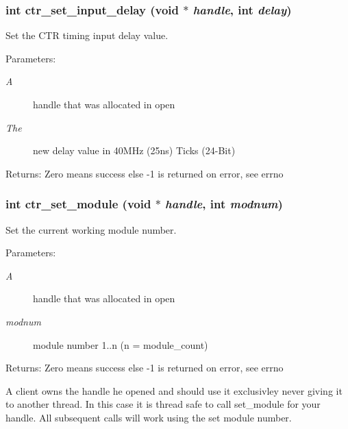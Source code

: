 \subsubsection{\setlength{\rightskip}{0pt plus 5cm}int ctr\_\-set\_\-input\_\-delay (void $\ast$ {\em handle}, int {\em delay})}\label{libctr_8doxygen_35f2c54af78bc72593dcc27474bc7fb8}


Set the CTR timing input delay value. 

\begin{Desc}
\item[Parameters:]
\begin{description}
\item[{\em A}]handle that was allocated in open \item[{\em The}]new delay value in 40MHz (25ns) Ticks (24-Bit) \end{description}
\end{Desc}
\begin{Desc}
\item[Returns:]Zero means success else -1 is returned on error, see errno \end{Desc}
\subsubsection{\setlength{\rightskip}{0pt plus 5cm}int ctr\_\-set\_\-module (void $\ast$ {\em handle}, int {\em modnum})}\label{libctr_8doxygen_f15e57a9ff2db2eaad0c370ad1e3daa9}


Set the current working module number. 

\begin{Desc}
\item[Parameters:]
\begin{description}
\item[{\em A}]handle that was allocated in open \item[{\em modnum}]module number 1..n (n = module\_\-count) \end{description}
\end{Desc}
\begin{Desc}
\item[Returns:]Zero means success else -1 is returned on error, see errno\end{Desc}
A client owns the handle he opened and should use it exclusivley never giving it to another thread. In this case it is thread safe to call set\_\-module for your handle. All subsequent calls will work using the set module number. 
